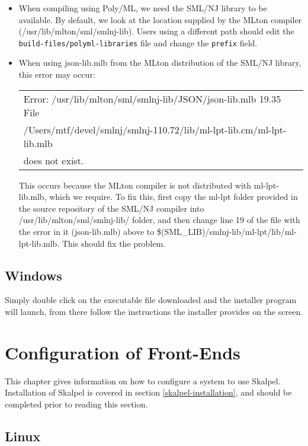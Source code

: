 \documentclass{report}
\begin{document}
\begin{itemize}
\item When compiling using Poly/ML, we need the SML/NJ library to be
  available. By default, we look at the location supplied by the MLton
  compiler (/usr/lib/mlton/sml/smlnj-lib). Users using a different
  path should edit the \texttt{build-files/polyml-libraries} file and
  change the \texttt{prefix} field.

\item When using json-lib.mlb from the MLton distribution of the
  SML/NJ library, this error may occur:

\begin{tabular}{l}
\noindent Error: /usr/lib/mlton/sml/smlnj-lib/JSON/json-lib.mlb 19.35 File\\
/Users/mtf/devel/smlnj/smlnj-110.72/lib/ml-lpt-lib.cm/ml-lpt-lib.mlb\\
does not exist.
\end{tabular}

This occurs because the MLton compiler is not distributed with
ml-lpt-lib.mlb, which we require. To fix this, first copy the ml-lpt
folder provided in the source repository of the SML/NJ compiler into
/usr/lib/mlton/sml/smlnj-lib/ folder, and then change line 19 of the
file with the error in it (json-lib.mlb) above to
\$(SML\_LIB)/smlnj-lib/ml-lpt/lib/ml-lpt-lib.mlb. This should fix the
problem.
\end{itemize}

\section{Windows}

Simply double click on the executable file downloaded and the
installer program will launch, from there follow the instructions the
installer provides on the screen.

\chapter{Configuration of Front-Ends}

This chapter gives information on how to configure a system to use
Skalpel. Installation of Skalpel is covered in section
\ref{skalpel-installation}, and should be completed prior to reading
this section.

\section{Linux}
\end{document}
